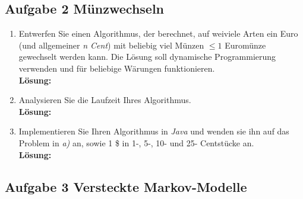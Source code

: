 \documentclass[11pt,a4paper,ngerman]{article}
\begin{document}

\subsection*{Aufgabe 2 \mdseries Münzwechseln}

\begin{enumerate}[\bfseries (a)]



\item Entwerfen Sie einen Algorithmus, der berechnet, auf weiviele Arten ein Euro (und allgemeiner \emph{n Cent}) mit beliebig viel Münzen $\leq 1$ Euromünze gewechselt werden kann. Die Lösung soll dynamische Programmierung verwenden und für beliebige Wärungen funktionieren.\\

\textbf{Lösung:}


\item Analysieren Sie die Laufzeit Ihres Algorithmus.\\

\textbf{Lösung:}


\item Implementieren Sie Ihren Algorithmus in \emph{Java} und wenden sie ihn auf das Problem in \emph{a)} an, sowie 1 \$ in 1-, 5-, 10- und 25- Centstücke an.\\

\textbf{Lösung:}

\end{enumerate}


\subsection*{Aufgabe 3 \mdseries Versteckte Markov-Modelle}
\end{document}
